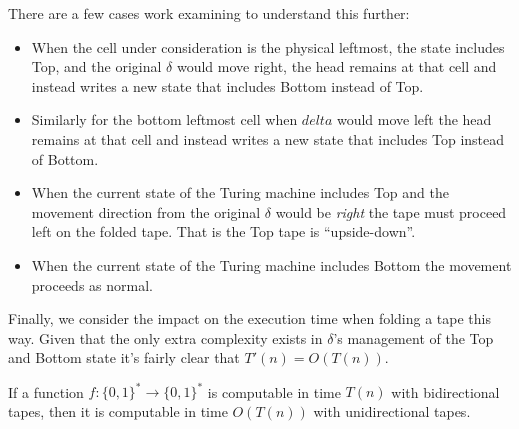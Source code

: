 \documentclass[usletter]{article}
\begin{document}
There are a few cases work examining to understand this further:

\begin{itemize}
  \item When the cell under consideration is the physical leftmost, the state includes Top, and the original $\delta$ would move right, the head remains at that cell and instead writes a new state that includes Bottom instead of Top.
  \item Similarly for the bottom leftmost cell when $delta$ would move left the head remains at  that cell and instead writes a new state that includes Top instead of Bottom.
  \item When the current state of the Turing machine includes Top and the movement direction from the original $\delta$ would be \textit{right} the tape must proceed left on the folded tape. That is the Top tape is ``upside-down''.
  \item When the current state of the Turing machine includes Bottom the movement proceeds as normal.
\end{itemize}

Finally, we consider the impact on the execution time when folding a tape this way. Given that the only extra complexity exists in $\delta$'s management of the Top and Bottom state it's fairly clear that $T'(n) = O(T(n))$.

\begin{theorem}
  If a function $f:\{0,1\}^* \rightarrow \{0,1\}^*$ is computable in time $T(n)$ with bidirectional tapes, then it is computable in time $O(T(n))$ with unidirectional tapes.
\end{theorem}

\newpage



\end{document}
